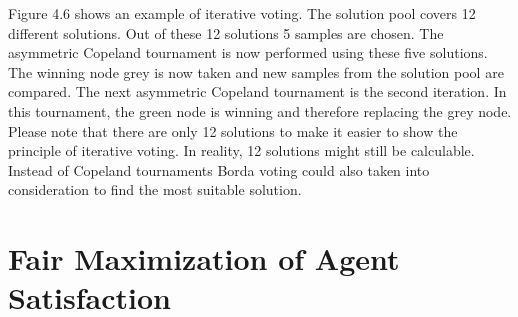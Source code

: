 \documentclass[german, a4paper, 11pt, oneside]{scrbook}
\begin{document}
Figure 4.6 shows an example of iterative voting. The solution pool covers 12 different solutions. Out of these 12 solutions 5 samples are chosen. The asymmetric Copeland tournament is now performed using these five solutions. The winning node grey is now taken and new samples from the solution pool are compared. The next asymmetric Copeland tournament is the second iteration. In this tournament, the green node is winning and therefore replacing the grey node. Please note that there are only 12 solutions to make it easier to show the principle of iterative voting. In reality, 12 solutions might still be calculable. Instead of Copeland tournaments Borda voting could also taken into consideration to find the most suitable solution.











\section{Fair Maximization of Agent Satisfaction}
\end{document}
